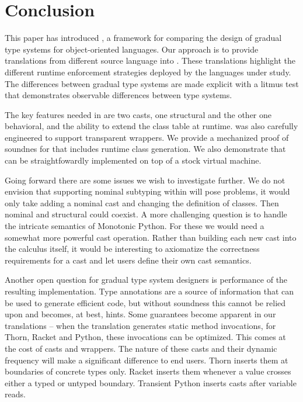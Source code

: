 \documentclass[acmsmall, anonymous, authordraft, review]{acmart} %
\begin{document}
\section{Conclusion}\label{litm}

This paper has introduced \kafka, a framework for comparing the design of
gradual type systems for object-oriented languages. Our approach is to
provide translations from different source language into \kafka. These
translations highlight the different runtime enforcement strategies deployed
by the languages under study. The differences between gradual type systems
are made explicit with a litmus test that demonstrates observable
differences between type systems.

The key features needed in \kafka are two casts, one structural and the
other one behavioral, and the ability to extend the class table at runtime.
\kafka was also carefully engineered to support transparent wrappers.  We
provide a mechanized proof of soundnes for \kafka that includes runtime
class generation.  We also demonstrate that \kafka can be straightfowardly
implemented on top of a stock virtual machine.

Going forward there are some issues we wish to investigate further.  We do
not envision that supporting nominal subtyping within \kafka will pose
problems, it would only take adding a nominal cast and changing the
definition of classes. Then nominal and structural could coexist. A more
challenging question is to handle the intricate semantics of Monotonic
Python. For these we would need a somewhat more powerful cast operation.
Rather than building each new cast into the calculus itself, it would be
interesting to axiomatize the correctness requirements for a cast and let
users define their own cast semantics. 

Another open question for gradual type system designers is performance of
the resulting implementation. Type annotations are a source of information
that can be used to generate efficient code, but without soundness this
cannot be relied upon and becomes, at best, hints.  Some guarantees become
apparent in our translations -- when the translation generates static method
invocations, for Thorn, Racket and Python, these invocations can be
optimized. This comes at the cost of casts and wrappers.  The nature of
these casts and their dynamic frequency will make a significant difference
to end users.  Thorn inserts them at boundaries of concrete types
only. Racket inserts them whenever a value crosses either a typed or untyped
boundary. Transient Python inserts casts after variable reads.
\end{document}
